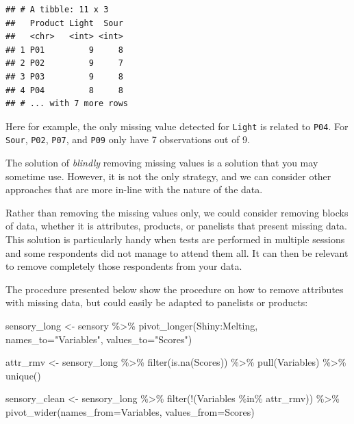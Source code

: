 \documentclass[
]{krantz}
\makeatletter
\newenvironment{Shaded}{\begin{snugshade}}{\end{snugshade}}
\newcommand{\AttributeTok}[1]{\textcolor[rgb]{0.61,0.61,0.61}{#1}}
\newcommand{\FunctionTok}[1]{\textcolor[rgb]{0,0,0}{#1}}
\newcommand{\NormalTok}[1]{#1}
\newcommand{\OtherTok}[1]{\textcolor[rgb]{0.37,0.37,0.37}{#1}}
\newcommand{\SpecialCharTok}[1]{\textcolor[rgb]{0,0,0}{#1}}
\newcommand{\StringTok}[1]{\textcolor[rgb]{0.5,0.5,0.5}{#1}}
\newenvironment{kframe}{%
\medskip{}
\setlength{\fboxsep}{.8em}
 \def\at@end@of@kframe{}%
 \ifinner\ifhmode%
  \def\at@end@of@kframe{\end{minipage}}%
  \begin{minipage}{\columnwidth}%
 \fi\fi%
 \def\FrameCommand##1{\hskip\@totalleftmargin \hskip-\fboxsep
 \colorbox{shadecolor}{##1}\hskip-\fboxsep
     \hskip-\linewidth \hskip-\@totalleftmargin \hskip\columnwidth}%
 \MakeFramed {\advance\hsize-\width
   \@totalleftmargin\z@ \linewidth\hsize
   \@setminipage}}%
 {\par\unskip\endMakeFramed%
 \at@end@of@kframe}
\renewenvironment{Shaded}{\begin{kframe}}{\end{kframe}}
\makeatother
\begin{document}
\begin{verbatim}
## # A tibble: 11 x 3
##   Product Light  Sour
##   <chr>   <int> <int>
## 1 P01         9     8
## 2 P02         9     7
## 3 P03         9     8
## 4 P04         8     8
## # ... with 7 more rows
\end{verbatim}

Here for example, the only missing value detected for \texttt{Light} is related to \texttt{P04}. For \texttt{Sour}, \texttt{P02}, \texttt{P07}, and \texttt{P09} only have 7 observations out of 9.

The solution of \emph{blindly} removing missing values is a solution that you may sometime use. However, it is not the only strategy, and we can consider other approaches that are more in-line with the nature of the data.

Rather than removing the missing values only, we could consider removing blocks of data, whether it is attributes, products, or panelists that present missing data. This solution is particularly handy when tests are performed in multiple sessions and some respondents did not manage to attend them all. It can then be relevant to remove completely those respondents from your data.

The procedure presented below show the procedure on how to remove attributes with missing data, but could easily be adapted to panelists or products:

\begin{Shaded}
\begin{Highlighting}[]
\NormalTok{sensory\_long }\OtherTok{\textless{}{-}}\NormalTok{ sensory }\SpecialCharTok{\%\textgreater{}\%} 
  \FunctionTok{pivot\_longer}\NormalTok{(Shiny}\SpecialCharTok{:}\NormalTok{Melting, }
               \AttributeTok{names\_to=}\StringTok{"Variables"}\NormalTok{, }\AttributeTok{values\_to=}\StringTok{"Scores"}\NormalTok{)}

\NormalTok{attr\_rmv }\OtherTok{\textless{}{-}}\NormalTok{ sensory\_long }\SpecialCharTok{\%\textgreater{}\%} 
  \FunctionTok{filter}\NormalTok{(}\FunctionTok{is.na}\NormalTok{(Scores)) }\SpecialCharTok{\%\textgreater{}\%} 
  \FunctionTok{pull}\NormalTok{(Variables) }\SpecialCharTok{\%\textgreater{}\%} 
  \FunctionTok{unique}\NormalTok{()}

\NormalTok{sensory\_clean }\OtherTok{\textless{}{-}}\NormalTok{ sensory\_long }\SpecialCharTok{\%\textgreater{}\%} 
  \FunctionTok{filter}\NormalTok{(}\SpecialCharTok{!}\NormalTok{(Variables }\SpecialCharTok{\%in\%}\NormalTok{ attr\_rmv)) }\SpecialCharTok{\%\textgreater{}\%} 
  \FunctionTok{pivot\_wider}\NormalTok{(}\AttributeTok{names\_from=}\NormalTok{Variables, }\AttributeTok{values\_from=}\NormalTok{Scores)}
\end{Highlighting}
\end{Shaded}
\end{document}
